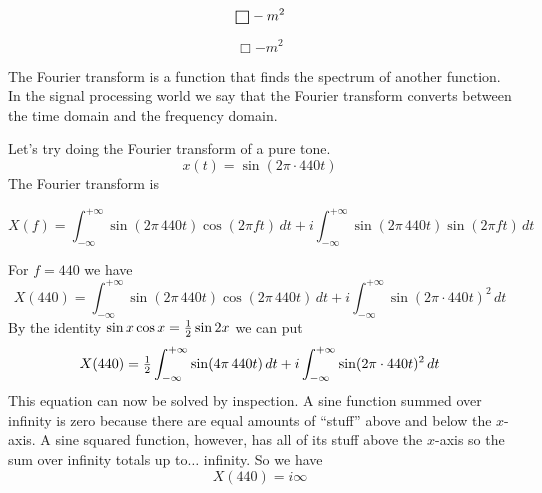 \documentclass[12pt]{book}
\newcommand{\bo}{\raise-1mm\hbox{\Large$\Box$}}
\begin{document}
$$\bo - m^2$$

$$\Box - m^2$$

The Fourier transform is a function that finds the spectrum of another function.
In the signal processing world we say that the Fourier transform converts
between the time domain and the frequency domain.

Let's try doing the Fourier transform of a pure tone.
$$x(t) = \sin(2\pi\cdot440t)$$
The Fourier transform is
\begin{plain}
$$X(f)=\int_{-\infty}^{+\infty}\sin(2\pi\,440t)\cos(2\pi ft)\,dt
+i\int_{-\infty}^{+\infty}\sin(2\pi\,440t)\sin(2\pi ft)\,dt
$$
\end{plain}
For $f=440$ we have
$$X(440)=\int_{-\infty}^{+\infty}\sin(2\pi\,440t)\cos(2\pi\,440t)\,dt
+i\int_{-\infty}^{+\infty}\sin(2\pi\cdot440t)^2\,dt
$$
By the identity $\sin x\cos x={1\over2}\sin2 x$ we can put
$$X(440)=\hbox{$1\over2$}\int_{-\infty}^{+\infty}\sin(4\pi\,440t)\,dt
+i\int_{-\infty}^{+\infty}\sin(2\pi\cdot440t)^2\,dt
$$
This equation can now be solved by inspection.
A sine function summed over infinity is zero because there are equal amounts
of ``stuff'' above and below the $x$-axis.
A sine squared function, however, has all of its stuff above the
$x$-axis so the sum over infinity totals up to$\ldots$ infinity. So we have
$$X(440)=i\infty$$
\end{document}
